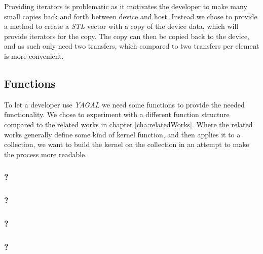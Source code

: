Providing iterators is problematic as it motivates the developer to make many small copies back and forth between device and host. Instead we chose to provide a method to create a \textit{STL} vector with a copy of the device data, which will provide iterators for the copy. The copy can then be copied back to the device, and as such only need two transfers, which compared to two transfers per element is more convenient.

\subsection{Functions}
To let a developer use \textit{YAGAL} we need some functions to provide the needed functionality. We chose to experiment with a different function structure compared to the related works in chapter \ref{cha:relatedWorks}. Where the related works generally define some kind of kernel function, and then applies it to a collection, we want to build the kernel on the collection in an attempt to make the process more readable.

\subsubsection{?}

\subsubsection{?}

\subsubsection{?}

\subsubsection{?}
